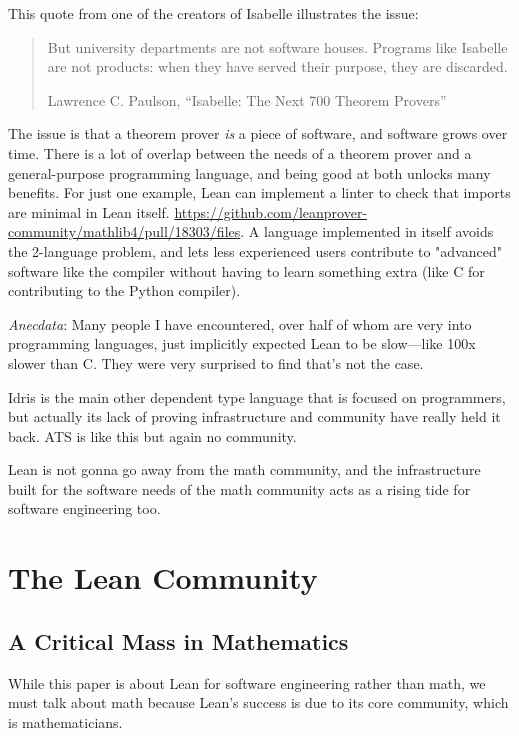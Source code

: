 \documentclass{article}
\begin{document}
This quote from one of the creators of Isabelle illustrates the issue:

\begin{quote}
  But university departments are not software houses. Programs like Isabelle are not products: when they have served
  their purpose, they are discarded. 

  Lawrence C. Paulson, ``Isabelle: The Next 700 Theorem Provers''

\end{quote}

The issue is that a theorem prover \textit{is} a piece of software, and software grows over time. There is a lot of overlap between the needs of a theorem prover and a general-purpose programming language, and being good at both unlocks many benefits. For just one example, Lean can implement a linter to check that imports are minimal in Lean itself. \url{https://github.com/leanprover-community/mathlib4/pull/18303/files}. A language implemented in itself avoids the 2-language problem, and lets less experienced users contribute to "advanced" software like the compiler without having to learn something extra (like C for contributing to the Python compiler).

\textit{Anecdata}: Many people I have encountered, over half of whom are very into programming languages, just implicitly expected Lean to be slow---like 100x slower than C. They were very surprised to find that's not the case.

Idris is the main other dependent type language that is focused on programmers, but actually its lack of proving infrastructure and community have really held it back. ATS is like this but again no community.

Lean is not gonna go away from the math community, and the infrastructure built for the software needs of the math community acts as a rising tide for software engineering too.

\section{The Lean Community}
\subsection{A Critical Mass in Mathematics}

While this paper is about Lean for software engineering rather than math, we must talk about math because Lean's success is due to its core community, which is mathematicians.
\end{document}
